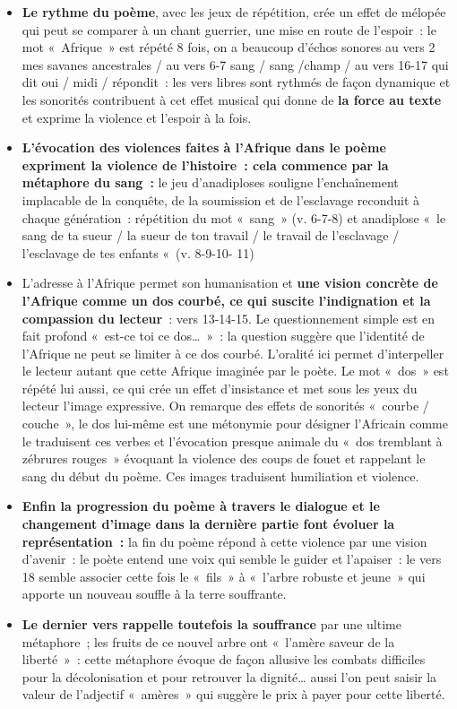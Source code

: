 {\begin{itemize}[label=\textbullet]
\item \textbf{Le rythme du poème}, avec les jeux de répétition, crée un effet de mélopée qui peut se
comparer à un chant guerrier, une mise en route de l'espoir~: le mot «~Afrique~» est répété
8 fois, on a beaucoup d'échos sonores au vers 2 mes savanes ancestrales / au vers 6-7 sang
/ sang /champ / au vers 16-17 qui dit oui / midi / répondit~: les vers libres sont rythmés de
façon dynamique et les sonorités contribuent à cet effet musical qui donne de \textbf{la force au texte} et exprime la violence et l'espoir à la fois.

\item \textbf{L'évocation des violences faites à l'Afrique dans le poème expriment la violence de
l'histoire~: cela commence par la métaphore du sang~:} le jeu d'anadiploses souligne
l'enchaînement implacable de la conquête, de la soumission et de l'esclavage reconduit à
chaque génération~: répétition du mot «~sang~» (v. 6-7-8) et anadiplose «~le sang de ta sueur
/ la sueur de ton travail / le travail de l'esclavage / l'esclavage de tes enfants «~(v. 8-9-10-
11)

\item L'adresse à l'Afrique permet son humanisation et \textbf{une vision concrète de l'Afrique
comme un dos courbé, ce qui suscite l'indignation et la compassion du lecteur}~: vers
13-14-15. Le questionnement simple est en fait profond «~est-ce toi ce dos…~»~: la question
suggère que l'identité de l'Afrique ne peut se limiter à ce dos courbé. L'oralité ici permet
d'interpeller le lecteur autant que cette Afrique imaginée par le poète. Le mot «~dos~» est
répété lui aussi, ce qui crée un effet d'insistance et met sous les yeux du lecteur l'image
expressive. On remarque des effets de sonorités «~courbe / couche~», le dos lui-même est
une métonymie pour désigner l'Africain comme le traduisent ces verbes et l'évocation
presque animale du «~dos tremblant à zébrures rouges~» évoquant la violence des coups de
fouet et rappelant le sang du début du poème. Ces images traduisent humiliation et
violence.

\item \textbf{Enfin la progression du poème à travers le dialogue et le changement d'image dans la
dernière partie font évoluer la représentation~:} la fin du poème répond à cette violence
par une vision d'avenir~: le poète entend une voix qui semble le guider et l'apaiser~: le vers
18 semble associer cette fois le «~fils~» à «~l'arbre robuste et jeune~» qui apporte un nouveau
souffle à la terre souffrante.

\item \textbf{Le dernier vers rappelle toutefois la souffrance} par une ultime métaphore~; les fruits de
ce nouvel arbre ont «~l'amère saveur de la liberté~»~: cette métaphore évoque de façon
allusive les combats difficiles pour la décolonisation et pour retrouver la dignité… aussi
l'on peut saisir la valeur de l'adjectif «~amères~» qui suggère le prix à payer pour cette
liberté.
\end{itemize}}%
